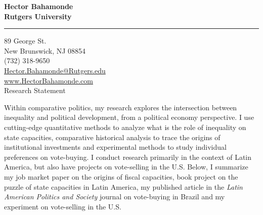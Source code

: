 \documentclass[11pt]{letter} %
\date{}
\begin{document}

\begin{letter}{} 


\begin{center}
\large\bf Hector Bahamonde \\ %
Rutgers University\\
\vspace{20pt} \hrule height 1pt %
89 George St. \\ New Brunswick, NJ 08854 \\ (732) 318-9650 \\ 
\href{mailto:hector.bahamonde@rutgers.edu}{Hector.Bahamonde@Rutgers.edu} \\
\href{http://www.hectorbahamonde.com}{www.HectorBahamonde.com}\\

{\huge\vspace{8mm} Research Statement}
\end{center} 

\signature{\vspace{7cm}h.b., fall 2016} %

\opening{} 
 

 Within comparative politics, my research explores the intersection between inequality and political development, from a political economy perspective. I use cutting-edge quantitative methods to analyze what is the role of inequality on state capacities, comparative historical analysis to trace the origins of institutional investments and  experimental methods to study individual preferences on vote-buying. I conduct research primarily in the context of Latin America, but also have projects on vote-selling in the U.S. Below, I summarize my job market paper on the origins of fiscal capacities, book project on the puzzle of state capacities in Latin America, my published article in the \emph{Latin American Politics and Society} journal on vote-buying in Brazil and my experiment on vote-selling in the U.S.


\end{letter}
\end{document}
